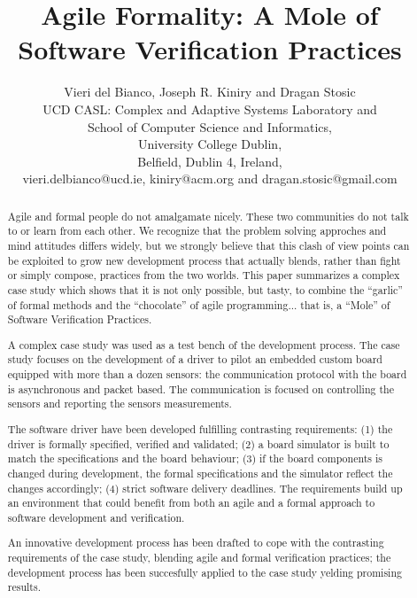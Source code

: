 \documentclass{article}
\begin{document}
\title{Agile Formality: A Mole of Software Verification Practices}

\author{Vieri del Bianco, Joseph R. Kiniry and Dragan Stosic\\
  UCD CASL: Complex and Adaptive Systems Laboratory and\\
  School of Computer Science and Informatics,\\
  University College Dublin,\\
  Belfield, Dublin 4, Ireland,\\
  vieri.delbianco@ucd.ie, kiniry@acm.org and dragan.stosic@gmail.com\\
}

\maketitle

\begin{abstract}

Agile and formal people do not amalgamate nicely. These two communities do not talk to or learn from each other. We recognize that the problem solving approches and mind attitudes differs widely, but we strongly believe that this clash of view points can be exploited to grow new development process that actually blends, rather than fight or simply compose, practices from the two worlds. This paper summarizes a complex case study which shows that it is not only possible, but tasty, to combine the ``garlic'' of formal methods and the ``chocolate'' of agile programming... that is, a ``Mole'' of Software Verification Practices.

A complex case study was used as a test bench of the development process. The case study focuses on the development of a driver to pilot an embedded custom board equipped with more than a dozen sensors: the communication protocol with the board is asynchronous and packet based. The communication is focused on controlling the sensors and reporting the sensors measurements.

The software driver have been developed fulfilling contrasting requirements: (1) the driver is formally specified, verified and validated; (2) a board simulator is built to match the specifications and the board behaviour; (3) if the board components is changed during development, the formal specifications and the simulator reflect the changes accordingly; (4) strict software delivery deadlines. The requirements build up an environment that could benefit from both an agile and a formal approach to software development and verification.

An innovative development process has been drafted to cope with the contrasting requirements of the case study, blending agile and formal verification practices; the development process has been succesfully applied to the case study yelding promising results. 

\end{abstract}
\end{document}
